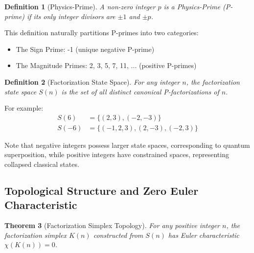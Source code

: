 \documentclass[conference]{IEEEtran}
\newtheorem{theorem}{Theorem}
\newtheorem{definition}[theorem]{Definition}
\begin{document}
\begin{definition}[Physics-Prime]
A non-zero integer $p$ is a Physics-Prime (P-prime) if its only integer divisors are $\pm 1$ and $\pm p$.
\end{definition}

This definition naturally partitions P-primes into two categories:
\begin{itemize}
\item The Sign Prime: -1 (unique negative P-prime)
\item The Magnitude Primes: 2, 3, 5, 7, 11, ... (positive P-primes)
\end{itemize}

\begin{definition}[Factorization State Space]
For any integer $n$, the factorization state space $S(n)$ is the set of all distinct canonical P-factorizations of $n$.
\end{definition}

For example:
\begin{align}
S(6) &= \{(2, 3), (-2, -3)\} \\
S(-6) &= \{(-1, 2, 3), (2, -3), (-2, 3)\}
\end{align}

Note that negative integers possess larger state spaces, corresponding to quantum superposition, while positive integers have constrained spaces, representing collapsed classical states.

\subsection{Topological Structure and Zero Euler Characteristic}

\begin{theorem}[Factorization Simplex Topology]
For any positive integer $n$, the factorization simplex $K(n)$ constructed from $S(n)$ has Euler characteristic $\chi(K(n)) = 0$.
\end{theorem}
\end{document}
